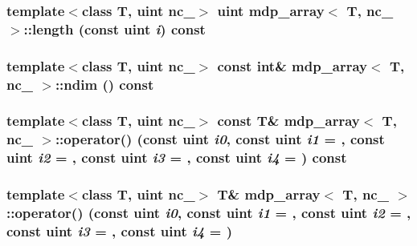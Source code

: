 \label{classmdp__array_a5e8cd60cd274b3a0e9835b66c6d430e6}
\hypertarget{classmdp__array_a4856c3ff5dbeeb3479a531e0c505559f}{
\subsubsection[{length}]{\setlength{\rightskip}{0pt plus 5cm}template$<$class T, uint nc\_\-$>$ {\bf uint} {\bf mdp\_\-array}$<$ T, nc\_\- $>$::length (const {\bf uint} {\em i}) const}}
\label{classmdp__array_a4856c3ff5dbeeb3479a531e0c505559f}
\hypertarget{classmdp__array_a20f4c81199739f0465af62c811cd60b7}{
\subsubsection[{ndim}]{\setlength{\rightskip}{0pt plus 5cm}template$<$class T, uint nc\_\-$>$ const int\& {\bf mdp\_\-array}$<$ T, nc\_\- $>$::ndim () const}}
\label{classmdp__array_a20f4c81199739f0465af62c811cd60b7}
\hypertarget{classmdp__array_a9ddceeb1b33b80495ef45afb812c0012}{
\subsubsection[{operator()}]{\setlength{\rightskip}{0pt plus 5cm}template$<$class T, uint nc\_\-$>$ const T\& {\bf mdp\_\-array}$<$ T, nc\_\- $>$::operator() (const {\bf uint} {\em i0}, \/  const {\bf uint} {\em i1} = {}, \/  const {\bf uint} {\em i2} = {}, \/  const {\bf uint} {\em i3} = {}, \/  const {\bf uint} {\em i4} = {}) const}}
\label{classmdp__array_a9ddceeb1b33b80495ef45afb812c0012}
\hypertarget{classmdp__array_a9e3a7e699387fb78562fb8d9c9ebea57}{
\subsubsection[{operator()}]{\setlength{\rightskip}{0pt plus 5cm}template$<$class T, uint nc\_\-$>$ T\& {\bf mdp\_\-array}$<$ T, nc\_\- $>$::operator() (const {\bf uint} {\em i0}, \/  const {\bf uint} {\em i1} = {}, \/  const {\bf uint} {\em i2} = {}, \/  const {\bf uint} {\em i3} = {}, \/  const {\bf uint} {\em i4} = {})}}

